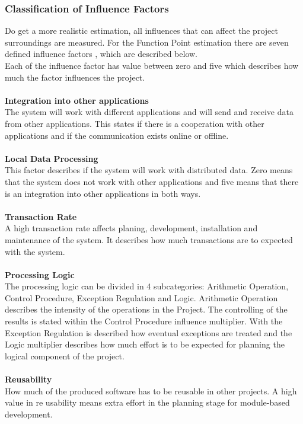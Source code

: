 \subsubsection{ Classification of Influence Factors}

Do get a more realistic estimation, all influences that can affect the project surroundings are measured. For the Function Point estimation there are seven defined influence factors \cite{Softwaremanagement}, which are described below.\\
Each of the influence factor has value between zero and five which describes how much the factor influences the project.\\
\\
\textbf{Integration into other applications}\\
The system will work with different applications and will send and receive data from other applications. This states if there is a cooperation with other applications and if the communication exists online or offline. 
\\
\\
\textbf{Local Data Processing}\\
This factor describes if the system will work with distributed data. Zero means that the system does not work with other applications and five means that there is an integration into other applications in both ways.\\
\\
\textbf{Transaction Rate}\\
A high transaction rate affects planing, development, installation and maintenance of the system. It describes how much transactions are to expected with the system.\\
\\
\textbf{Processing Logic}\\
The processing logic can be divided in 4 subcategories: Arithmetic Operation, Control Procedure, Exception Regulation and Logic. Arithmetic Operation describes the intensity of the operations in the Project. The controlling of the results is stated within the Control Procedure influence multiplier. With the Exception Regulation is described how eventual exceptions are treated and the Logic multiplier describes how much effort is to be expected for planning the logical component of the project.\\
\\
\textbf{Reusability}\\
How much of the produced software has to be reusable in other projects. A high value in re usability means extra effort in the planning stage for module-based development.\\
